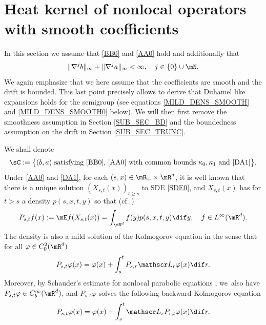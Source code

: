 \section{Heat kernel of nonlocal operators with smooth coefficients}
\label{SEC_HK_SMOOTH_COEFF}
In this section we assume that \eqref{BB0} and \eqref{AA0} hold and additionally that
\begin{equation}\label{DA1}
\|\nabla^jb\|_\infty+\|\nabla^ja\|_\infty<\infty,\quad j\in\{0\}\cup\mN.
\end{equation}
We again emphasize that we here assume that the coefficients are smooth and the drift is bounded. This last point precisely allows to derive that Duhamel like expansions holds for the semigroup (see equations \eqref{MILD_DENS_SMOOTH} and \eqref{MILD_DENS_SMOOTH0} below). We will then first remove the smoothness assumption in Section \ref{SUB_SEC_BD} and the boundedness assumption on the drift in Section \ref{SUB_SEC_TRUNC}.

We shall denote
\[
\sC:=\big\{(b,a) \text{ satisfying \eqref{BB0}, \eqref{AA0} with common bounds $\kappa_0,\kappa_1$ and \eqref{DA1}}\big\}.
\]
Under \eqref{AA0} and \eqref{DA1},
for each $(s,x)\in\mR_+\times\mR^d$,
it is well known that there is a unique solution $(X_{s,t}(x))_{t\geq s}$ to SDE \eqref{SDE0},
and $X_{s,t}(x)$ has for $t>s$ a density $p(s,x,t,y)$ so that (cf. \cite{De-Fo, CHZ})\vspace*{-3pt}
\[
P_{s,t} f(x):=\mE f(X_{s,t}(x))=\int_{\mR^d}f(y)p(s,x,t,y)\dif y,\quad f\in L^\infty(\mR^d).
\]
The density is also a mild solution of the Kolmogorov equation in the sense that for all $\varphi\in C_0^2(\mR^d) $\vspace*{-3pt}
\begin{equation}
\label{MILD_DENS_SMOOTH}
P_{s,t} \varphi(x)=\varphi(x)+\int_s^t P_{s,r}\mathscr L_r \varphi (x)\dif r.
\end{equation}
Moreover, by Schauder's estimate for nonlocal parabolic equations \cite[Th.\,3.5]{Zh-Zh}, we~also have $P_{s,t}\varphi\in C^\infty_b(\mR^d)$, and
$P_{s,t}\varphi$ solves the following backward Kolmogorov equation\vspace*{-3pt}
\begin{equation}
\label{MILD_DENS_SMOOTH0}
P_{s,t} \varphi(x)=\varphi(x)+\int_s^t\mathscr L_r P_{r,t}\varphi (x)\dif r.
\end{equation}

